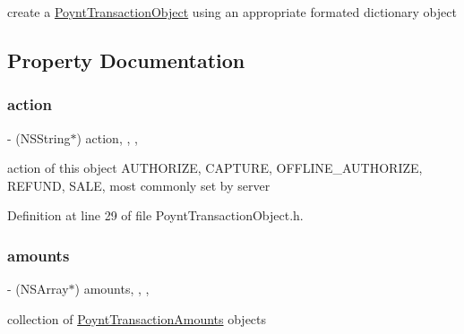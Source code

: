 create a \hyperlink{interface_poynt_transaction_object}{Poynt\+Transaction\+Object} using an appropriate formated dictionary object 

\subsection{Property Documentation}
\hypertarget{interface_poynt_transaction_object_aaab84b2e5d0ad0f648e7e0e17c6afa08}{}\label{interface_poynt_transaction_object_aaab84b2e5d0ad0f648e7e0e17c6afa08} 
\subsubsection{\texorpdfstring{action}{action}}
{\footnotesize\ttfamily -\/ (N\+S\+String$\ast$) action\hspace{0.3cm}{\ttfamily [read]}, {\ttfamily [write]}, {\ttfamily [nonatomic]}, {\ttfamily [copy]}}



action of this object  \textquotesingle{}A\+U\+T\+H\+O\+R\+I\+ZE\textquotesingle{}, \textquotesingle{}C\+A\+P\+T\+U\+RE\textquotesingle{}, \textquotesingle{}O\+F\+F\+L\+I\+N\+E\+\_\+\+A\+U\+T\+H\+O\+R\+I\+ZE\textquotesingle{}, \textquotesingle{}R\+E\+F\+U\+ND\textquotesingle{}, \textquotesingle{}S\+A\+LE\textquotesingle{}, most commonly set by server 



Definition at line 29 of file Poynt\+Transaction\+Object.\+h.

\hypertarget{interface_poynt_transaction_object_a5ab449d070271ee2c9d138bb7b472a6c}{}\label{interface_poynt_transaction_object_a5ab449d070271ee2c9d138bb7b472a6c} 
\subsubsection{\texorpdfstring{amounts}{amounts}}
{\footnotesize\ttfamily -\/ (N\+S\+Array$\ast$) amounts\hspace{0.3cm}{\ttfamily [read]}, {\ttfamily [write]}, {\ttfamily [nonatomic]}, {\ttfamily [strong]}}



collection of \hyperlink{interface_poynt_transaction_amounts}{Poynt\+Transaction\+Amounts} objects 




